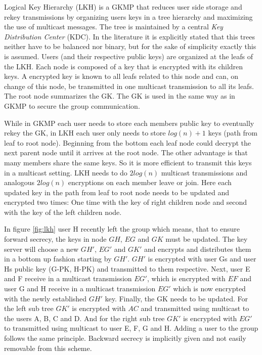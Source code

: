 Logical Key Hierarchy (\ac{LKH})\cite{wallner1999key} is a \ac{GKMP} that reduces user side storage and rekey transmissions by organizing users keys in a tree hierarchy and maximizing the use of multicast messages. The tree is maintained by a central \textit{Key Distribution Center} (\ac{KDC}). In the literature it is explicitly stated that this trees neither have to be balanced nor binary, but for the sake of simplicity exactly this is assumed. Users (and their respective public keys) are organized at the leafs of the LKH. Each node is composed of a key that is encrypted with its children keys. A encrypted key is known to all leafs related to this node and can, on change of this node, be transmitted in one multicast transmission to all its leafs. The root node summarizes the \ac{GK}. The \ac{GK} is used in the same way as in \ac{GKMP} to secure the group communication. 

While in \ac{GKMP} each user needs to store each members public key to eventually rekey the GK, in \ac{LKH} each user only needs to store $log(n) +1$ keys (path from leaf to root node). Beginning from the bottom each leaf node could decrypt the next parent node until it arrives at the root node. The other advantage is that many members share the same keys. So it is more efficient to transmit this keys in a multicast setting. \ac{LKH} needs to do $2log(n)$ multicast transmissions and analogous $2log(n)$ encryptions on each member leave or join.  Here each updated key in the path from leaf to root node needs to be updated and encrypted two times: One time with the key of right children node and second with the key of the left children node. 

In figure \ref{fig:lkh} user H recently left the group which means, that to ensure forward secrecy, the keys in node $GH$, $EG$ and $GK$ must be updated. The key server will choose a new $GH'$, $EG'$ and $GK'$ and encrypts and distributes them in a bottom up fashion starting by $GH'$. $GH'$ is encrypted with user Gs and user Hs public key (G-PK, H-PK) and transmitted to them respective. Next, user E and F receive in a multicast transmission $EG'$, which is encrypted with $EF$ and user G and H receive in a multicast transmission $EG'$ which is now encrypted with the newly established $GH'$ key. Finally, the GK needs to be updated. For the left sub tree $GK'$ is encrypted with $AC$ and transmitted using multicast to the users A, B, C and D. And for the right sub tree $GK'$ is encrypted with $EG'$ to transmitted using multicast to user E, F, G and H. Adding a user to the group follows the same principle. Backward secrecy is implicitly given and not easily removable from this scheme.

